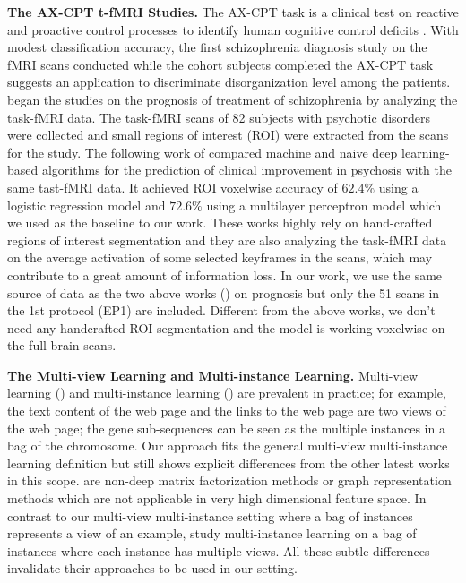 \textbf{The AX-CPT t-fMRI Studies.}\label{sec:6.3} The AX-CPT task is a clinical test on reactive and proactive control processes to identify human cognitive control deficits \cite{LESH2013590}. With modest classification accuracy, the first schizophrenia diagnosis study \cite{yoon2012automated} on the fMRI scans conducted while the cohort subjects completed the AX-CPT task suggests an application to discriminate disorganization level among the patients. \cite{doi:10.1176/appi.ajp.2019.18101126} began the studies on the prognosis of treatment of schizophrenia by analyzing the task-fMRI data. The task-fMRI scans of 82 subjects with psychotic disorders were collected and small regions of interest (ROI) were extracted from the scans for the study. The following work of \cite{https://doi.org/10.1002/hbm.25286} compared machine and naive deep learning-based algorithms for the prediction of clinical improvement in psychosis with the same tast-fMRI data. It achieved ROI voxelwise accuracy of $62.4\%$ using a logistic regression model and $72.6\%$ using a multilayer perceptron model which we used as the baseline to our work. These works highly rely on hand-crafted regions of interest segmentation and they are also analyzing the task-fMRI data on the average activation of some selected keyframes in the scans, which may contribute to a great amount of information loss. In our work, we use the same source of data \footnotemark as the two above works (\cite{doi:10.1176/appi.ajp.2019.18101126, https://doi.org/10.1002/hbm.25286, smucny2021comparing}) on prognosis but only the 51 scans in the 1st protocol (EP1) are included. Different from the above works, we don't need any handcrafted ROI segmentation and the model is working voxelwise on the full brain scans. 


\textbf{The Multi-view Learning and Multi-instance Learning.}\label{sec:6.4} Multi-view learning (\cite{yan2021deep}) and multi-instance learning (\cite{carbonneau2018multiple}) are prevalent in practice; for example, the text content of the web page and the links to the web page are two views of the web page; the gene sub-sequences can be seen as the multiple instances in a bag of the chromosome. Our approach fits the general multi-view multi-instance learning definition but still shows explicit differences from the other latest works in this scope. \cite{nguyen2014labeling, li2017multi, wang2020differentiating, cen2019representation} are non-deep matrix factorization methods or graph representation methods which are not applicable in very high dimensional feature space. In contrast to our multi-view multi-instance setting where a bag of instances represents a view of an example, \cite{yuan2018multi, yang2021deep, xing2019multi} study multi-instance learning on a bag of instances where each instance has multiple views. All these subtle differences invalidate their approaches to be used in our setting.